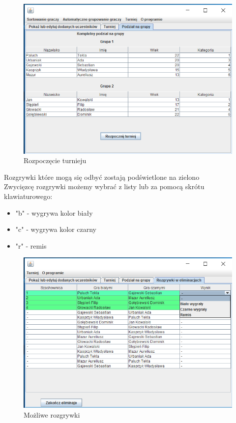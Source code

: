 \begin{figure}[H]
	\centering
	\includegraphics[width=15cm]{fig/11}
	\caption{Rozpoczęcie turnieju}
	\label {fig:rozpoczecie_turnieju} 
\end{figure}
Rozgrywki które mogą się odbyć zostają podświetlone na zielono\\
Zwycięzcę rozgrywki możemy wybrać z listy lub za pomocą skrótu klawiaturowego:
\begin{itemize}
	\item "b" - wygrywa kolor biały
	\item "c" - wygrywa kolor czarny
	\item "r" - remis
\end{itemize}

\begin{figure}[H]
	\centering
	\includegraphics[width=15cm]{fig/12}
	\caption{Możliwe rozgrywki}
	\label {fig:mozliwe_rozgrywki} 
\end{figure}

